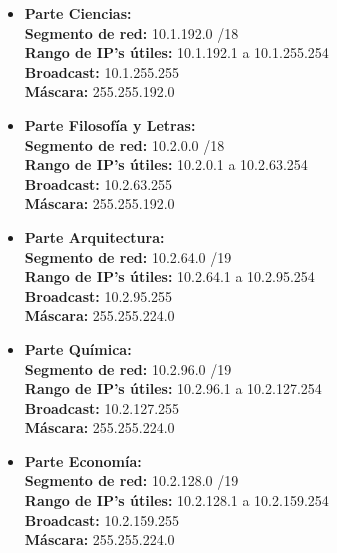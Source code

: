 \begin{itemize}[leftmargin=*]
    \item \textbf{Parte Ciencias:} \\
    \textbf{Segmento de red:} 10.1.192.0 /18 \\
    \textbf{Rango de IP's útiles:} 10.1.192.1 a 10.1.255.254 \\
    \textbf{Broadcast:} 10.1.255.255 \\
    \textbf{Máscara:} 255.255.192.0 
    \vspace{5pt}

    \item \textbf{Parte Filosofía y Letras:} \\
    \textbf{Segmento de red:} 10.2.0.0 /18 \\
    \textbf{Rango de IP's útiles:} 10.2.0.1 a 10.2.63.254 \\
    \textbf{Broadcast:} 10.2.63.255 \\
    \textbf{Máscara:} 255.255.192.0 
    \vspace{5pt}

    \item \textbf{Parte Arquitectura:} \\
    \textbf{Segmento de red:} 10.2.64.0 /19 \\
    \textbf{Rango de IP's útiles:} 10.2.64.1 a 10.2.95.254 \\
    \textbf{Broadcast:} 10.2.95.255 \\
    \textbf{Máscara:} 255.255.224.0 
    \vspace{5pt}

    \item \textbf{Parte Química:} \\
    \textbf{Segmento de red:} 10.2.96.0 /19 \\
    \textbf{Rango de IP's útiles:} 10.2.96.1 a 10.2.127.254 \\
    \textbf{Broadcast:} 10.2.127.255 \\
    \textbf{Máscara:} 255.255.224.0 
    \vspace{5pt}

    \item \textbf{Parte Economía:} \\
    \textbf{Segmento de red:} 10.2.128.0 /19 \\
    \textbf{Rango de IP's útiles:} 10.2.128.1 a 10.2.159.254 \\
    \textbf{Broadcast:} 10.2.159.255 \\
    \textbf{Máscara:} 255.255.224.0 
    \vspace{5pt}


\end{itemize}
